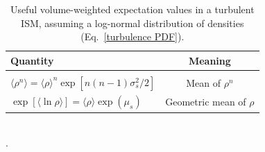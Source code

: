 \documentclass[fleqn,usenatbib]{mnras}
\begin{document}
\begin{table}
\caption{Useful volume-weighted expectation values in a turbulent ISM, assuming a log-normal distribution of densities (Eq.~\ref{turbulence PDF}).}
\begin{tabular}{l c}
\hline
\hline
Quantity & Meaning  \\

\hline
\hline

\\
\vspace{8 pt}

$\langle \rho^n \rangle =  \langle \rho \rangle^n\exp[n(n - 1) \sigma_s^2 /2 ] $ & Mean of $\rho^n$  \\

\vspace{8 pt}

$\exp[\langle \ln \rho \rangle] =  \langle \rho \rangle \exp(\mu_s) $ & Geometric mean of $\rho$  

\\

\hline
\hline
\end{tabular}
\vspace{1 pt}\\.
\label{turbulent density fluctuations}
\end{table}
\end{document}
